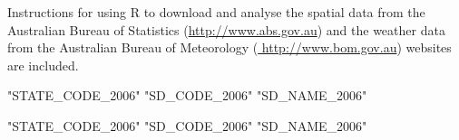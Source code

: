 \documentclass[a4paper]{article}                %
\begin{document}

        Instructions for using R to download and analyse the spatial data from the Australian Bureau of Statistics (\url{http://www.abs.gov.au}) and the weather data from the Australian Bureau of Meteorology (\url{ http://www.bom.gov.au}) websites are included.



\begin{Schunk}
\begin{Soutput}
[1] "STATE_CODE_2006" "SD_CODE_2006"    "SD_NAME_2006"   
\end{Soutput}
\end{Schunk}


\begin{Schunk}
\begin{Soutput}
[1] "STATE_CODE_2006" "SD_CODE_2006"    "SD_NAME_2006"   
\end{Soutput}
\end{Schunk}





\end{document}
